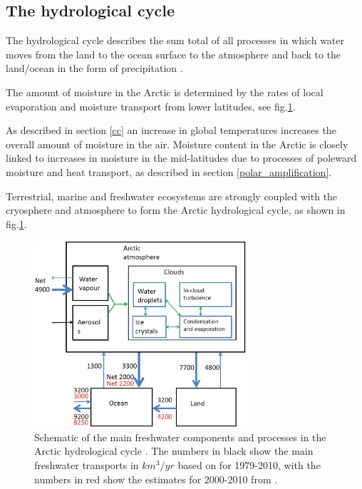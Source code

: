 \documentclass[12pt, oneside]{article}
\begin{document}
\subsection{The hydrological cycle}
The hydrological cycle describes the sum total of all processes in which water moves from the land to the ocean surface to the atmosphere and back to the land/ocean in the form of precipitation \cite{CHAKRAVARTY2019203}. 

The amount of moisture in the Arctic is determined by the rates of local evaporation and moisture transport from lower latitudes, see fig.\ref{fig:hydro_cycle}. 


As described in section \ref{cc} an increase in global temperatures increases the overall amount of moisture in the air. Moisture content in the Arctic is closely linked to increases in moisture in the mid-latitudes due to processes of poleward moisture and heat transport, as described in section \ref{polar_amplification}.

Terrestrial, marine and freshwater ecosystems are strongly coupled with the cryosphere and atmosphere to form the Arctic hydrological cycle, as shown in fig.\ref{fig:hydro_cycle}.  


\begin{figure}[h!]
\centering
\includegraphics[width=0.7\textwidth]{hydological_cycle.png}
\caption{Schematic of the main freshwater components and processes in the Arctic hydrological cycle \cite{vihma2016atmospheric}. The numbers in black show the main freshwater transports in $km^3/yr$ based on \cite{serreze2006large} for 1979-2010, with the numbers in red show the estimates for 2000-2010 from   \cite{haine2015arctic}. }\label{fig:hydro_cycle}
\end{figure}
\end{document}
